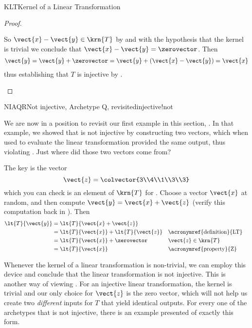 \begin{subsect}{KLT}{Kernel of a Linear Transformation}
\begin{proof}
\begin{para}
\end{para}
%
\begin{para}So $\vect{x}-\vect{y}\in\krn{T}$ by  and with the hypothesis that the kernel is trivial we conclude that $\vect{x}-\vect{y}=\zerovector$.  Then
%
\begin{align*}
\vect{y}
=\vect{y}+\zerovector
=\vect{y}+\left(\vect{x}-\vect{y}\right)
=\vect{x}
\end{align*}
%
thus establishing that $T$ is injective by .\end{para}
%
\end{proof}
%
\begin{example}{NIAQR}{Not injective, Archetype Q, revisited}{injective!not}
\begin{para}We are now in a position to revisit our first example in this section, .  In that example, we showed that  is not injective by constructing two vectors, which when used to evaluate the linear transformation provided the same output, thus violating .  Just where did those two vectors come from?\end{para}
%
\begin{para}The key is the vector
%
\begin{equation*}
\vect{z}=\colvector{3\\4\\1\\3\\3}
\end{equation*}
%
which you can check is an element of $\krn{T}$ for .  Choose a vector $\vect{x}$ at random, and then compute $\vect{y}=\vect{x}+\vect{z}$ (verify this computation back in ).  Then
%
\begin{align*}
\lt{T}{\vect{y}}&=\lt{T}{\vect{x}+\vect{z}}\\
&=\lt{T}{\vect{x}}+\lt{T}{\vect{z}}&&\text{\acronymref{definition}{LT}}\\
&=\lt{T}{\vect{x}}+\zerovector&&\vect{z}\in\krn{T}\\
&=\lt{T}{\vect{x}}&&\text{\acronymref{property}{Z}}
\end{align*}
\end{para}
%
\begin{para}Whenever the kernel of a linear transformation is non-trivial, we can employ this device and conclude that the linear transformation is not injective.  This is another way of viewing .  For an injective linear transformation, the kernel is trivial and our only choice for $\vect{z}$ is the zero vector, which will not help us create two {\em different} inputs for $T$ that yield identical outputs.  For every one of the archetypes that is not injective, there is an example presented of exactly this form.\end{para}

\end{example}
\end{subsect}
